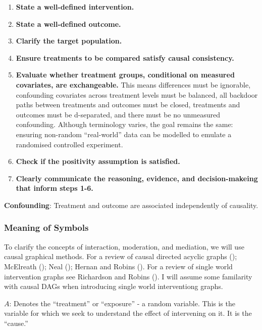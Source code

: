 \documentclass[
  single column]{article}
\providecommand{\tightlist}{%
  \setlength{\itemsep}{0pt}\setlength{\parskip}{0pt}}\usepackage{longtable,booktabs,array}
\begin{document}
\begin{enumerate}
\def\labelenumi{\arabic{enumi}.}
\tightlist
\item
  \textbf{State a well-defined intervention.}
\item
  \textbf{State a well-defined outcome.}
\item
  \textbf{Clarify the target population.}
\item
  \textbf{Ensure treatments to be compared satisfy causal consistency.}
\item
  \textbf{Evaluate whether treatment groups, conditional on measured
  covariates, are exchangeable.} This means differences must be
  ignorable, confounding covariates across treatment levels must be
  balanced, all backdoor paths between treatments and outcomes must be
  closed, treatments and outcomes must be d-separated, and there must be
  no unmeasured confounding. Although terminology varies, the goal
  remains the same: ensuring non-random ``real-world'' data can be
  modelled to emulate a randomised controlled experiment.
\item
  \textbf{Check if the positivity assumption is satisfied.}
\item
  \textbf{Clearly communicate the reasoning, evidence, and
  decision-makeing that inform steps 1-6.}
\end{enumerate}

\textbf{Confounding}: Treatment and outcome are associated independently
of causality.

\subsubsection{Meaning of Symbols}\label{meaning-of-symbols}

To clarify the concepts of interaction, moderation, and mediation, we
will use causal graphical methods. For a review of causal directed
acyclic graphs (); McElreath
(); Neal
(); Hernan and Robins
(). For a review of single world
intervention graphs see Richardson and Robins
(). I will assume some
familarity with causal DAGs when introducing single world interventiong
graphs.

\textbf{\(A\)}: Denotes the ``treatment'' or ``exposure'' - a random
variable. This is the variable for which we seek to understand the
effect of intervening on it. It is the ``cause.''
\end{document}
